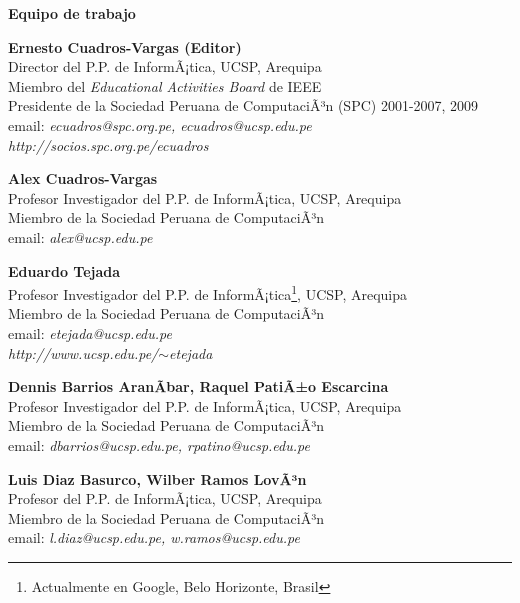 \begin{center}
{\bf \Huge Equipo de trabajo}
\end{center}
\vspace{1cm}

\begin{center}
\textbf{Ernesto Cuadros-Vargas (Editor)}\\
Director del P.P. de InformÃ¡tica, UCSP, Arequipa\\
Miembro del \textit{Educational Activities Board} de IEEE\\
Presidente de la Sociedad Peruana de ComputaciÃ³n (SPC) 2001-2007, 2009\\
email: \textit{ecuadros@spc.org.pe, ecuadros@ucsp.edu.pe}\\
\textit{http://socios.spc.org.pe/ecuadros}
\end{center}

\begin{center}
\textbf{Alex Cuadros-Vargas}\\
Profesor Investigador del P.P. de InformÃ¡tica, UCSP, Arequipa\\
Miembro de la Sociedad Peruana de ComputaciÃ³n\\
email: \textit{alex@ucsp.edu.pe}\\
\end{center}

\begin{center}
\textbf{Eduardo Tejada}\\
Profesor Investigador del P.P. de InformÃ¡tica\footnote{Actualmente en Google, Belo Horizonte, Brasil}, UCSP, Arequipa\\
Miembro de la Sociedad Peruana de ComputaciÃ³n\\
email: \textit{etejada@ucsp.edu.pe}\\
\textit{http://www.ucsp.edu.pe/$\sim$etejada}
\end{center}

\begin{center}
\textbf{Dennis Barrios AranÃ­bar, Raquel PatiÃ±o Escarcina}\\
Profesor Investigador del P.P. de InformÃ¡tica, UCSP, Arequipa\\
Miembro de la Sociedad Peruana de ComputaciÃ³n\\
email: \textit{dbarrios@ucsp.edu.pe, rpatino@ucsp.edu.pe}
\end{center}

\begin{center}
\textbf{Luis Diaz Basurco, Wilber Ramos LovÃ³n}\\
Profesor del P.P. de InformÃ¡tica, UCSP, Arequipa\\
Miembro de la Sociedad Peruana de ComputaciÃ³n\\
email: \textit{l.diaz@ucsp.edu.pe, w.ramos@ucsp.edu.pe}
\end{center}

